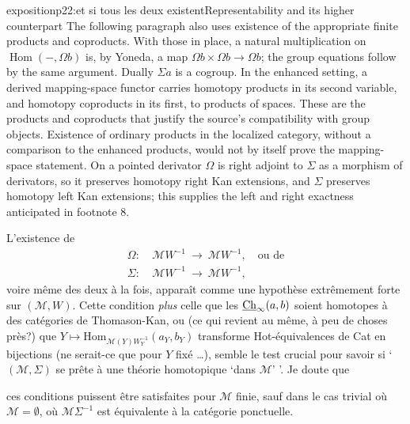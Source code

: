 \begin{dcomment}{exposition}{p22:et si tous les deux existent}{Representability and its higher counterpart}
The following paragraph also uses existence of the appropriate finite products and coproducts. With those in place, a natural multiplication on $\operatorname{Hom}(-,\Omega b)$ is, by Yoneda, a map $\Omega b\times\Omega b\to\Omega b$; the group equations follow by the same argument. Dually $\Sigma a$ is a cogroup. In the enhanced setting, a derived mapping-space functor carries homotopy products in its second variable, and homotopy coproducts in its first, to products of spaces. These are the products and coproducts that justify the source's compatibility with group objects. Existence of ordinary products in the localized category, without a comparison to the enhanced products, would not by itself prove the mapping-space statement. On a pointed derivator $\Omega$ is right adjoint to $\Sigma$ as a morphism of derivators, so it preserves homotopy right Kan extensions, and $\Sigma$ preserves homotopy left Kan extensions; this supplies the left and right exactness anticipated in footnote 8.
\end{dcomment}



L'existence de
\[
\begin{aligned}
\Omega :\ & \mathcal{M}W^{-1} \ \longrightarrow\ \mathcal{M}W^{-1}, \quad \text{ou de}\\
\Sigma :\ & \mathcal{M}W^{-1} \ \longrightarrow\ \mathcal{M}W^{-1},
\end{aligned}
\]
voire même des deux à la fois, apparaît comme une hypothèse  extrêmement forte sur $(\mathcal{M}, W)$. Cette condition \textit{plus} celle  que les $\underline{\mathrm{Ch}}_{\infty}(a,b)$ soient homotopes à des catégories de Thomason-Kan, ou (ce qui revient au même, à peu de choses près?) que $Y \longmapsto \mathrm{Hom}_{\mathcal{M}(Y)W_Y^{-1}}(a_Y, b_Y)$ transforme Hot-équivalences de Cat en bijections (ne serait-ce que pour $Y$ fixé \dots), semble le test crucial pour savoir si `$(\mathcal{M}, \Sigma)$ se prête à une théorie homotopique `dans $\mathcal{M}$' '. Je doute que


ces conditions puissent être satisfaites pour $\mathcal{M}$ finie, sauf dans le cas trivial où $\mathcal{M} = \emptyset$, où $\mathcal{M}\Sigma^{-1}$ est équivalente à la catégorie ponctuelle.

